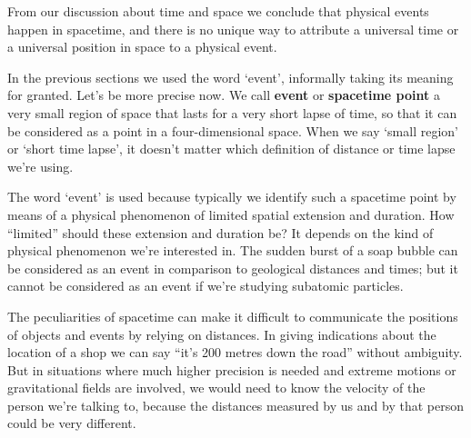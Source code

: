 \documentclass[a4paper,12pt,%
onecolumn,oneside,%
british%
]{memoir}
\renewcommand*{\|}[1][]{\nonscript\:#1\vert\nonscript\:\mathopen{}}
\newcommand*{\yc}{c} %
\begin{document}
%
From our discussion about time and space we conclude that physical events happen in spacetime, and there is no unique way to attribute a universal time or a universal position in space to a physical event.

In the previous sections we used the word \enquote*{event}, informally taking its meaning for granted. Let's be more precise now. We call \textbf{event} or \textbf{spacetime point} a very small region of space that lasts for a very short lapse of time, so  that it can be considered as a point in a four-dimensional space. When we say \enquote*{small region} or \enquote*{short time lapse}, it doesn't matter which definition of distance or time lapse we're using.

The word \enquote*{event} is used because typically we identify such a spacetime point by means of a physical phenomenon of limited spatial extension and duration. How \enquote{limited} should these extension and duration be? It depends on the kind of physical phenomenon we're interested in. The sudden burst of a soap bubble can be considered as an event in comparison to geological distances and times; but it cannot be considered as an event if we're studying subatomic particles.


\medskip

The peculiarities of spacetime can make it difficult to communicate the positions of objects and events by relying on distances. In giving indications about the location of a shop we can say \enquote{it's 200 metres down the road} without ambiguity. But in situations where much higher precision is needed and extreme motions or gravitational fields are involved, we would need to know the velocity of the person we're talking to, because the distances measured by us and by that person could be very different. %
\end{document}
